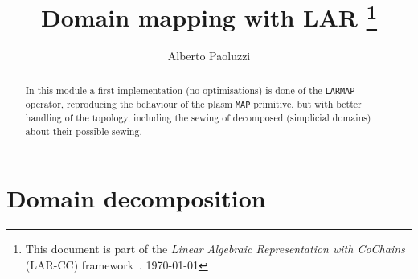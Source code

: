 \documentclass[11pt,oneside]{article}	%
\title{Domain mapping with LAR
\footnote{This document is part of the \emph{Linear Algebraic Representation with CoChains} (LAR-CC) framework~\cite{cclar-proj:2013:00}. \today}
}
\author{Alberto Paoluzzi}
\begin{document}
\maketitle
\nonstopmode

\begin{abstract}
In this module a first implementation (no optimisations) is done of the \texttt{LARMAP} operator, reproducing the behaviour of the plasm \texttt{MAP} primitive, but with better handling of the topology, including the sewing of decomposed (simplicial domains) about their possible sewing.
\end{abstract}

\tableofcontents

\section{Domain decomposition}
\end{document}
